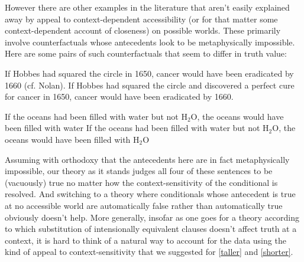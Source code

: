 \documentclass[If.tex]{subfiles}
\begin{document}
However there are other examples in the literature that aren't easily explained away by appeal to context-dependent accessibility (or for that matter some context-dependent account of closeness) on possible worlds.  These primarily involve counterfactuals whose antecedents look to be metaphysically impossible.  Here are some pairs of such counterfactuals that seem to differ in truth value:
\begin{prop}
	\nitem
	\begin{prop}
		\aitem
		If Hobbes had squared the circle in 1650, cancer would have been eradicated by 1660 (cf. Nolan).
		\aitem
		If Hobbes had squared the circle and discovered a perfect cure for cancer in 1650, cancer would have been eradicated by 1660.  
	\end{prop}
	\nitem
	\begin{prop}
		\aitem
		If the oceans had been filled with water but not H$_2$O, the oceans would have been filled with water
		\aitem
		If the oceans had been filled with water but not H$_2$O, the oceans would have been filled with H$_2$O
	\end{prop}
\end{prop}
Assuming with orthodoxy that the antecedents here are in fact metaphysically impossible, our theory as it stands judges all four of these sentences to be (vacuously) true no matter how the context-sensitivity of the conditional is resolved.  And switching to a theory where conditionals whose antecedent is true at no accessible world are automatically false rather than automatically true obviously doesn't help.  More generally, insofar as one goes for a theory according to which substitution of intensionally equivalent clauses doesn't affect truth at a context, it is hard to think of a natural way to account for the data using the kind of appeal to context-sensitivity that we suggested for \ref{taller} and \ref{shorter}.  
\end{document}

